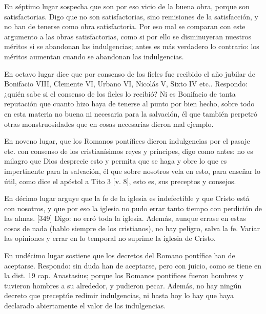 En séptimo lugar sospecha que son por eso vicio de la buena obra, porque son satisfactorias. Digo que no son satisfactorias, sino remisiones de la satisfacción, y no han de tenerse como obra satisfactoria. Por eso mal se comparan con este argumento a las obras satisfactorias, como si por ello se disminuyeran nuestros méritos si se abandonan las indulgencias; antes es más verdadero lo contrario: los méritos aumentan cuando se abandonan las indulgencias.

En octavo lugar dice que por consenso de los fieles fue recibido el año jubilar de Bonifacio VIII, Clemente VI, Urbano VI, Nicolás V, Sixto IV etc.. Respondo: ¿quién sabe si el consenso de los fieles lo recibió? Ni es Bonifacio de tanta reputación que cuanto hizo haya de tenerse al punto por bien hecho, sobre todo en esta materia no buena ni necesaria para la salvación, él que también perpetró otras monstruosidades que en cosas necesarias dieron mal ejemplo.

En noveno lugar, que los Romanos pontífices dieron indulgencias por el pasaje etc. con consenso de los cristianísimos reyes y príncipes, digo como antes: no es milagro que Dios desprecie esto y permita que se haga y obre lo que es impertinente para la salvación, él que sobre nosotros vela en esto, para enseñar lo útil, como dice el apóstol a Tito 3 [v. 8], esto es, sus preceptos y consejos.

En décimo lugar arguye que la fe de la iglesia es indefectible y que Cristo está con nosotros, y que por eso la iglesia no pudo errar tanto tiempo con perdición de las almas. [349] Digo: no erró toda la iglesia. Además, aunque errase en estas cosas de nada (hablo siempre de los cristianos), no hay peligro, salva la fe. Variar las opiniones y errar en lo temporal no suprime la iglesia de Cristo.

En undécimo lugar sostiene que los decretos del Romano pontífice han de aceptarse. Respondo: sin duda han de aceptarse, pero con juicio, como se tiene en la dist. 19 cap. Anastasius; porque los Romanos pontífices fueron hombres y tuvieron hombres a su alrededor, y pudieron pecar. Además, no hay ningún decreto que preceptúe redimir indulgencias, ni hasta hoy lo hay que haya declarado abiertamente el valor de las indulgencias.

